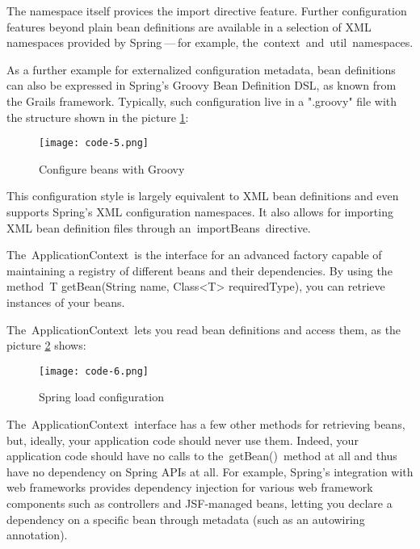 The namespace itself provices the import directive feature. Further configuration features beyond plain bean definitions are available in a selection of XML namespaces provided by Spring — for example, the context and util namespaces.

As a further example for externalized configuration metadata, bean definitions can also be expressed in Spring’s Groovy Bean Definition DSL, as known from the Grails framework. Typically, such configuration live in a ".groovy" file with the structure shown in the picture \ref{fig:spring-code-5-en}:

\begin{figure}[!ht]
  \centering
  \texttt{[image: code-5.png]}
  \caption{Configure beans with Groovy}
  \label{fig:spring-code-5-en}
\end{figure}

This configuration style is largely equivalent to XML bean definitions and even supports Spring’s XML configuration namespaces. It also allows for importing XML bean definition files through an importBeans directive.

The ApplicationContext is the interface for an advanced factory capable of maintaining a registry of different beans and their dependencies. By using the method T getBean(String name, Class<T> requiredType), you can retrieve instances of your beans.

The ApplicationContext lets you read bean definitions and access them, as the picture \ref{fig:spring-code-6-en} shows:

\begin{figure}[!ht]
  \centering
  \texttt{[image: code-6.png]}
  \caption{Spring load configuration}
  \label{fig:spring-code-6-en}
\end{figure}

The ApplicationContext interface has a few other methods for retrieving beans, but, ideally, your application code should never use them. Indeed, your application code should have no calls to the getBean() method at all and thus have no dependency on Spring APIs at all. For example, Spring’s integration with web frameworks provides dependency injection for various web framework components such as controllers and JSF-managed beans, letting you declare a dependency on a specific bean through metadata (such as an autowiring annotation).


